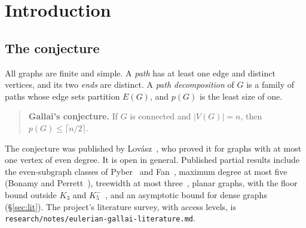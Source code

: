 \documentclass[11pt]{amsart}
\theoremstyle{definition}
\begin{document}
\begin{abstract}
\begin{itemize}[leftmargin=*]
What is open beyond that is \emph{compatibility}: several constraints in one decomposition, DL$(k)$
and its all-odd form. The obstructions are proved: universal twins, the cocktail-party barrier, the
cone over $K_{2,6}$ for forest bases, and the absence of steering schedules at roots of degree
$|J|-2$.
\item \emph{The frontier} is deletion degree $6$ with a dense neighbourhood. There two constraints
must hold at once, and every constrained vertex is adjacent to the even vertex. Lean proves that
$k$-token steering cannot reach roots of degree $|J|-2$. The asymptotic dense theorem of
Gir\~ao--Granet--K\"uhn--Osthus needs linear minimum degree and has a $o(n)$ error, so it does not
apply.
\end{itemize}
New here, besides the consolidation: the converse of the all-odd lift, with independent proofs and
checks of the (T2) converses; the all-odd lift with the root as a child of the forest, which gives (T1) at the three order-$9$ roots where every forest base fails;
and a list of disagreements between the component documents. Nothing conjectural is upgraded.
\end{abstract}

\maketitle

\setcounter{tocdepth}{1}
\tableofcontents

\section{Introduction}\label{sec:intro}

\subsection{The conjecture}
All graphs are finite and simple. A \emph{path} has at least one edge and distinct vertices, and its
two \emph{ends} are distinct. A \emph{path decomposition} of $G$ is a family of paths whose edge sets
partition $E(G)$, and $p(G)$ is the least size of one.

\begin{quote}
\textbf{Gallai's conjecture.} If $G$ is connected and $|V(G)|=n$, then $p(G)\le\lceil n/2\rceil$.
\end{quote}

The conjecture was published by Lov\'asz~\cite{L68}, who proved it for graphs with at most one vertex
of even degree. It is open in general. Published partial results include the even-subgraph classes
of Pyber~\cite{Pyb} and Fan~\cite{Fan05}, maximum degree at most five (Bonamy and
Perrett~\cite{BP}), treewidth at most three~\cite{BSCL}, planar graphs, with the floor bound outside
$K_3$ and $K_5^-$~\cite{BBB}, and an asymptotic bound for dense graphs~\cite{GGKO} (\S\ref{sec:lit}).
The project's literature survey, with access levels, is
\texttt{research/notes/eulerian-gallai-literature.md}.
\end{document}
